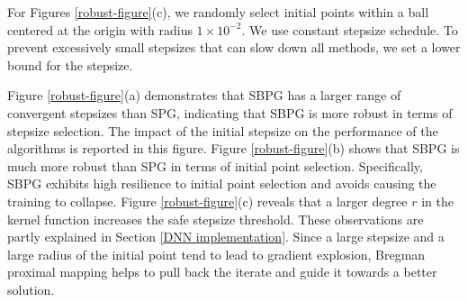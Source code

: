 \documentclass[twoside,11pt]{article}
\begin{document}
{For Figures \ref{robust-figure}(c), we randomly select initial points within a ball centered at the origin with radius $1\times10^{-2}$. We use constant stepsize schedule. To prevent excessively small stepsizes that can slow down all methods, we set a lower bound for the stepsize.

Figure \ref{robust-figure}(a) demonstrates that SBPG has a larger range of convergent stepsizes than SPG, indicating that SBPG is more robust in terms of stepsize selection. The impact of the initial stepsize on the performance of the algorithms is reported in this figure. Figure \ref{robust-figure}(b) shows that SBPG is much more robust than SPG in terms of initial point selection. Specifically, SBPG exhibits high resilience to initial point selection and avoids causing the training to collapse. Figure \ref{robust-figure}(c) reveals that a larger degree $r$ in the kernel function increases the safe stepsize threshold. These observations are partly explained in Section \ref{DNN implementation}. Since a large stepsize and a large radius of the initial point tend to lead to gradient explosion, Bregman proximal mapping helps to pull back the iterate and guide it towards a better solution.



}
\end{document}
